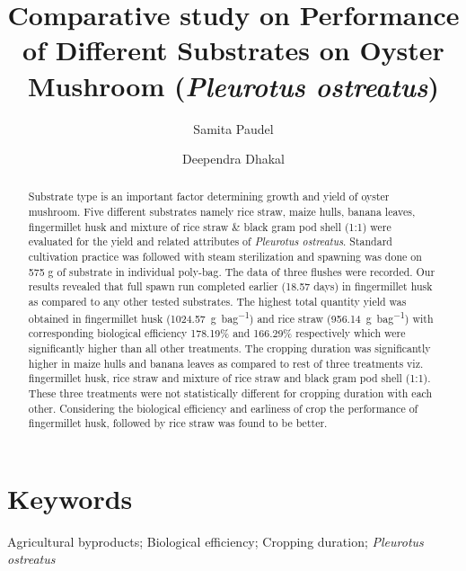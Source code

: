 \documentclass[]{elsarticle} %
\begin{document}
\begin{frontmatter}

  \title{Comparative study on Performance of Different Substrates on Oyster
Mushroom (\textit{Pleurotus ostreatus})}
    \author[Department of Horticulture and Plant Protection]{Samita Paudel}
  
  
    \author[Department of Plant Breeding]{Deependra Dhakal}
    
  \begin{abstract}
  Substrate type is an important factor determining growth and yield of
  oyster mushroom. Five different substrates namely rice straw, maize
  hulls, banana leaves, fingermillet husk and mixture of rice straw \&
  black gram pod shell (1:1) were evaluated for the yield and related
  attributes of \textit{Pleurotus ostreatus}. Standard cultivation
  practice was followed with steam sterilization and spawning was done on
  575 g of substrate in individual poly-bag. The data of three flushes
  were recorded. Our results revealed that full spawn run completed
  earlier (18.57 days) in fingermillet husk as compared to any other
  tested substrates. The highest total quantity yield was obtained in
  fingermillet husk (\SI{1024.57}{\gram \per bag}) and rice straw
  (\SI{956.14}{\gram \per bag}) with corresponding biological efficiency
  178.19\% and 166.29\% respectively which were significantly higher than
  all other treatments. The cropping duration was significantly higher in
  maize hulls and banana leaves as compared to rest of three treatments
  viz. fingermillet husk, rice straw and mixture of rice straw and black
  gram pod shell (1:1). These three treatments were not statistically
  different for cropping duration with each other. Considering the
  biological efficiency and earliness of crop the performance of
  fingermillet husk, followed by rice straw was found to be better.
  \end{abstract}
  
 \end{frontmatter}

\hypertarget{keywords}{%
\section*{Keywords}\label{keywords}}

Agricultural byproducts; Biological efficiency; Cropping duration;
\textit{Pleurotus ostreatus}
\end{document}
